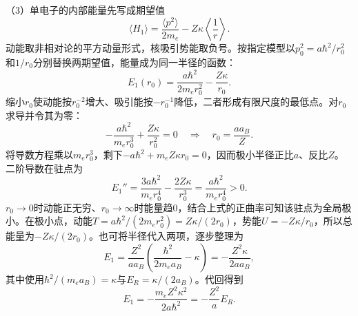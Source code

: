 \documentclass[UTF8,fontset=fandol,a4paper,11pt]{ctexart}
\begin{document}
（3）单电子的内部能量先写成期望值
\[
\langle H_1\rangle=\frac{\langle p^2\rangle}{2m_e}-Z\kappa\left\langle\frac1r\right\rangle.
\]
动能取非相对论的平方动量形式，核吸引势能取负号。按指定模型以$p_0^2=a\hbar^2/r_0^2$和$1/r_0$分别替换两期望值，能量成为同一半径的函数：
\[
E_1(r_0)=\frac{a\hbar^2}{2m_er_0^2}-\frac{Z\kappa}{r_0}.
\]
缩小$r_0$使动能按$r_0^{-2}$增大、吸引能按$-r_0^{-1}$降低，二者形成有限尺度的最低点。对$r_0$求导并令其为零：
\[
-\frac{a\hbar^2}{m_er_0^3}+\frac{Z\kappa}{r_0^2}=0
\quad\Longrightarrow\quad
\boxed{r_0=\frac{a a_B}{Z}}.
\]
将导数方程乘以$m_er_0^3$，剩下$-a\hbar^2+m_eZ\kappa r_0=0$，因而极小半径正比$a$、反比$Z$。二阶导数在驻点为
\[
E_1''=\frac{3a\hbar^2}{m_er_0^4}-\frac{2Z\kappa}{r_0^3}
=\frac{a\hbar^2}{m_er_0^4}>0.
\]
$r_0\to0$时动能正无穷、$r_0\to\infty$时能量趋0，结合上式的正曲率可知该驻点为全局极小。在极小点，动能$T=a\hbar^2/(2m_er_0^2)=Z\kappa/(2r_0)$，势能$U=-Z\kappa/r_0$，所以总能量为$-Z\kappa/(2r_0)$。也可将半径代入两项，逐步整理为
\[
E_1=\frac{Z^2}{aa_B}\left(\frac{\hbar^2}{2m_ea_B}-\kappa\right)
=-\frac{Z^2\kappa}{2aa_B},
\]
其中使用$\hbar^2/(m_ea_B)=\kappa$与$E_R=\kappa/(2a_B)$。代回得到
\[
\boxed{E_1=-\frac{m_eZ^2\kappa^2}{2a\hbar^2}
=-\frac{Z^2}{a}E_R}.
\]
\end{document}
